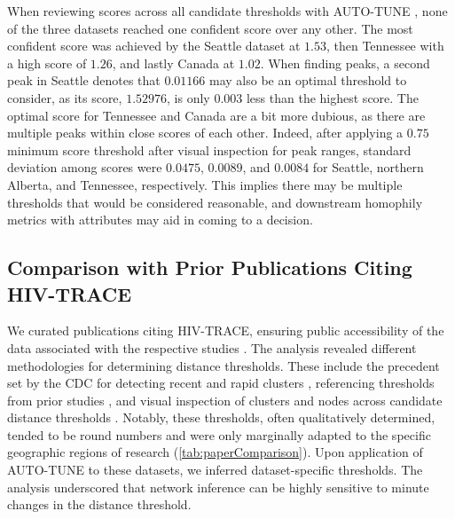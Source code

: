\documentclass[utf8]{FrontiersinHarvard} %
\begin{document}


When reviewing scores across all candidate thresholds with AUTO-TUNE
\label{fig:clustuner}, none of the three datasets reached one confident score
over any other. The most confident score was achieved by the Seattle dataset at
$1.53$, then Tennessee with a high score of $1.26$, and lastly Canada at
$1.02$. When finding peaks, a second peak in Seattle denotes that $0.01166$ may
also be an optimal threshold to consider, as its score, $1.52976$, is only
$0.003$ less than the highest score. The optimal score for Tennessee and Canada
are a bit more dubious, as there are multiple peaks within close scores of each
other. Indeed, after applying a $0.75$ minimum score threshold after visual
inspection for peak ranges, standard deviation among scores were $0.0475$,
$0.0089$, and $0.0084$ for Seattle, northern Alberta, and Tennessee,
respectively. This implies there may be multiple thresholds that would be
considered reasonable, and downstream homophily metrics with attributes may aid
in coming to a decision.

\subsection{Comparison with Prior Publications Citing HIV-TRACE}

We curated publications citing HIV-TRACE, ensuring public accessibility of the
data associated with the respective studies \citep{rhee_national_2019,
brenner_role_2021, h_acquisition_2021, liu_dynamics_2020, bbosa_short_2020,
yan_central_2020, dalai_combining_2018, sivay_hiv-1_2018}. The analysis
revealed different methodologies for determining distance thresholds. These
include the precedent set by the CDC for detecting recent and rapid clusters
\citep{yan_central_2020}, referencing thresholds from prior studies
\citep{sivay_hiv-1_2018}, and visual inspection of clusters and nodes across
candidate distance thresholds \citep{liu_dynamics_2020}. Notably, these
thresholds, often qualitatively determined, tended to be round numbers and were
only marginally adapted to the specific geographic regions of research
(\autoref{tab:paperComparison}). Upon application of AUTO-TUNE to these
datasets, we inferred dataset-specific thresholds. The analysis underscored
that network inference can be highly sensitive to minute changes in the
distance threshold. 
\end{document}
